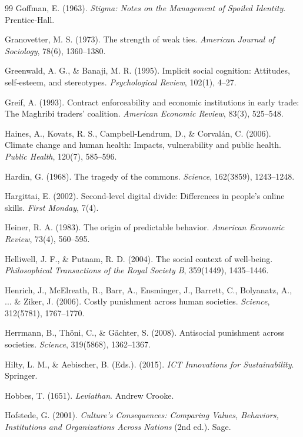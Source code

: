 \begin{thebibliography}{99}
Goffman, E. (1963).
\textit{Stigma: Notes on the Management of Spoiled Identity}.
Prentice-Hall.

Granovetter, M. S. (1973).
The strength of weak ties.
\textit{American Journal of Sociology}, 78(6), 1360--1380.

Greenwald, A. G., \& Banaji, M. R. (1995).
Implicit social cognition: Attitudes, self-esteem, and stereotypes.
\textit{Psychological Review}, 102(1), 4--27.

Greif, A. (1993).
Contract enforceability and economic institutions in early trade: The Maghribi traders' coalition.
\textit{American Economic Review}, 83(3), 525--548.

Haines, A., Kovats, R. S., Campbell-Lendrum, D., \& Corvalán, C. (2006).
Climate change and human health: Impacts, vulnerability and public health.
\textit{Public Health}, 120(7), 585--596.

Hardin, G. (1968).
The tragedy of the commons.
\textit{Science}, 162(3859), 1243--1248.

Hargittai, E. (2002).
Second-level digital divide: Differences in people's online skills.
\textit{First Monday}, 7(4).

Heiner, R. A. (1983).
The origin of predictable behavior.
\textit{American Economic Review}, 73(4), 560--595.

Helliwell, J. F., \& Putnam, R. D. (2004).
The social context of well-being.
\textit{Philosophical Transactions of the Royal Society B}, 359(1449), 1435--1446.

Henrich, J., McElreath, R., Barr, A., Ensminger, J., Barrett, C., Bolyanatz, A., ... \& Ziker, J. (2006).
Costly punishment across human societies.
\textit{Science}, 312(5781), 1767--1770.

Herrmann, B., Thöni, C., \& Gächter, S. (2008).
Antisocial punishment across societies.
\textit{Science}, 319(5868), 1362--1367.

Hilty, L. M., \& Aebischer, B. (Eds.). (2015).
\textit{ICT Innovations for Sustainability}.
Springer.

Hobbes, T. (1651).
\textit{Leviathan}.
Andrew Crooke.

Hofstede, G. (2001).
\textit{Culture's Consequences: Comparing Values, Behaviors, Institutions and Organizations Across Nations} (2nd ed.).
Sage.


\end{thebibliography}
